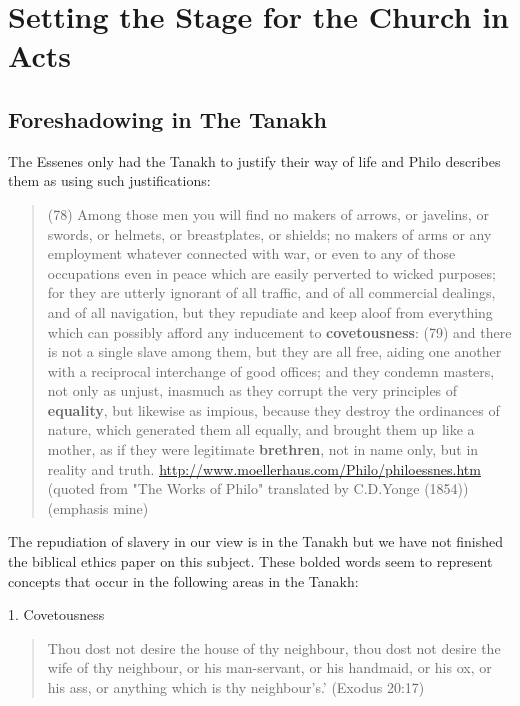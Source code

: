 \documentclass[11pt]{article}
\begin{document}
\section{Setting the Stage for the Church in Acts}

\subsection{Foreshadowing in The Tanakh} \label{foreshadowing in the tanakh}
The Essenes only had the Tanakh to justify their way of life and Philo describes them as using such justifications:
\begin{quote}
(78) Among those men you will find no makers of arrows, or javelins, or swords, or helmets, or breastplates, or shields; no makers of arms or any employment whatever connected with war, or even to any of those occupations even in peace which are easily perverted to wicked purposes; for they are utterly ignorant of all traffic, and of all commercial dealings, and of all navigation, but they repudiate and keep aloof from everything which can possibly afford any inducement to \textbf{covetousness}: (79) and there is not a single slave among them, but they are all free, aiding one another with a reciprocal interchange of good offices; and they condemn masters, not only as unjust, inasmuch as they corrupt the very principles of \textbf{equality}, but likewise as impious, because they destroy the ordinances of nature, which generated them all equally, and brought them up like a mother, as if they were legitimate \textbf{brethren}, not in name only, but in reality and truth.  \url{http://www.moellerhaus.com/Philo/philoessnes.htm} (quoted from "The Works of Philo" translated by C.D.Yonge (1854)) (emphasis mine)
\end{quote}
The repudiation of slavery in our view is in the Tanakh but we have not finished the biblical ethics paper on this subject. These bolded words seem to represent concepts that occur in the following areas in the Tanakh: \newline

1. Covetousness
\begin{quote}
Thou dost not desire the house of thy neighbour, thou dost not desire the wife of thy neighbour, or his man-servant, or his handmaid, or his ox, or his ass, or anything which is thy neighbour's.' (Exodus 20:17)
\end{quote}
\end{document}
